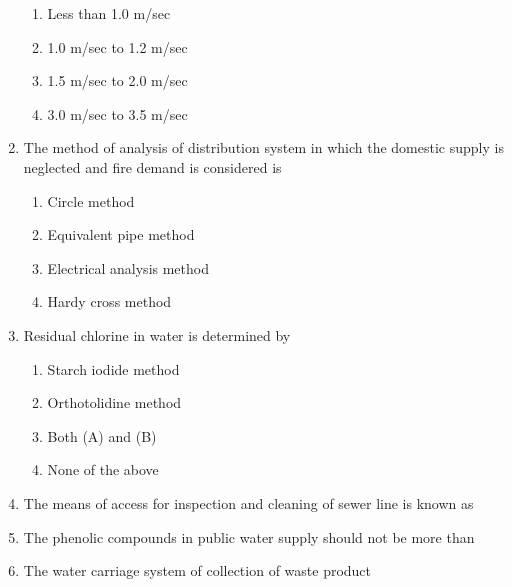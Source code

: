 \documentclass[11pt,a4paper]{article}
\begin{document}
\begin{enumerate}
\begin{enumerate}[label=\Alph*.]
\item{Less than 1.0 m/sec}
\item{1.0 m/sec to 1.2 m/sec}
\item{1.5 m/sec to 2.0 m/sec}
\item{3.0 m/sec to 3.5 m/sec}
\end{enumerate}
\item{The method of analysis of distribution system in which the domestic supply is neglected and fire demand is considered is}
\begin{enumerate}[label=\Alph*.]
\item{Circle method}
\item{Equivalent pipe method}
\item{Electrical analysis method}
\item{Hardy cross method}
\end{enumerate}
\item{Residual chlorine in water is determined by}
\begin{enumerate}[label=\Alph*.]
\item{Starch iodide method}
\item{Orthotolidine method}
\item{Both (A) and (B)}
\item{None of the above}
\end{enumerate}
\item{The means of access for inspection and cleaning of sewer line is known as}
\\
\item{The phenolic compounds in public water supply should not be more than}
\\
\item{The water carriage system of collection of waste product}
\begin{enumerate}[label=\Alph*.]

\end{enumerate}
\end{enumerate}
\end{document}
